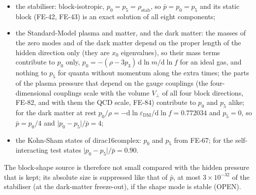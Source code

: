 \documentclass[
  10pt,
]{article}
\providecommand{\tightlist}{%
  \setlength{\itemsep}{0pt}\setlength{\parskip}{0pt}}
\begin{document}
\begin{itemize}
\tightlist
\item
  the stabiliser: block-isotropic, \(p_0 = p_5 = \rho_{\mathrm{stab}}\),
  so \(\bar p = p_0 = p_5\) and its static block (FE-42, FE-43) is an
  exact solution of all eight components;
\item
  the Standard-Model plasma and matter, and the dark matter: the masses
  of the zero modes and of the dark matter depend on the proper length
  of the hidden direction only (they are \(x_0\) eigenvalues), so their
  mass terms contribute to \(p_0\) only,
  \(p_0 = -(\rho - 3p_3)\,\mathrm{d}\ln m/\mathrm{d}\ln f\) for an ideal
  gas, and nothing to \(p_5\) for quanta without momentum along the
  extra times; the parts of the plasma pressure that depend on the gauge
  couplings (the four-dimensional couplings scale with the volume
  \(V_\perp\) of all four block directions, FE-82, and with them the QCD
  scale, FE-84) contribute to \(p_0\) and \(p_5\) alike; for the dark
  matter at rest
  \(p_0/\rho = -\mathrm{d}\ln\varepsilon_{\mathrm{DM}}/\mathrm{d}\ln f = 0.772034\)
  and \(p_5 = 0\), so \(\bar p = p_0/4\) and
  \(\lvert p_0 - p_5\rvert/\bar p = 4\);
\item
  the Kohn-Sham states of dirac16complex: \(p_0\) and \(p_5\) from
  FE-67; for the self-interacting test states
  \(\lvert p_0 - p_5\rvert/\bar p = 0.90\).
\end{itemize}

The block-shape source is therefore not small compared with the hidden
pressure that is kept; its absolute size is suppressed like that of
\(\bar p\), at most \(3\times10^{-32}\) of the stabiliser (at the
dark-matter freeze-out), if the shape mode is stable (OPEN).
\end{document}
